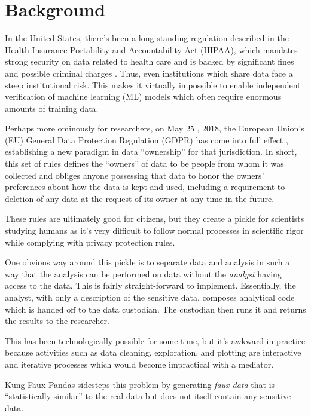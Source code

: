 \documentclass{article}
\begin{document}
\section{Background}

In the United States, there's been a long-standing regulation described in the Health Insurance Portability and Accountability Act (HIPAA), which mandates strong security on data related to health care and is backed by significant fines and possible criminal charges \cite{hippaviol}.  Thus, even institutions which share data face a steep institutional risk. This makes it virtually impossible to enable independent verification of machine learning (ML) models which often require enormous amounts of training data.

Perhaps more ominously for researchers, on May 25 , 2018, the European Union's (EU) General Data Protection Regulation (GDPR) has come into full effect \cite{gdpr}, establishing a new paradigm in data ``ownership'' for that jurisdiction.   In short, this set of rules defines the ``owners'' of data to be people from whom it was collected and obliges anyone possessing  that data to  honor the owners' preferences about how the data is kept and used, including a requirement to deletion of any data at the request of its owner at any time in the future.

These rules are ultimately good for citizens, but they create a pickle for scientists studying humans as it's very difficult to follow normal processes in scientific rigor while complying with privacy protection rules.

One obvious way around this pickle is to separate data and analysis in such a way that the analysis can be performed on data without the \emph{analyst} having access to the data.   This is fairly straight-forward to implement.   Essentially, the analyst, with only a description of the sensitive data, composes analytical code which is handed off to the data custodian.  The custodian then runs it and returns the results to the researcher.

This has been technologically possible for some time, but it's awkward in practice because activities such as data cleaning, exploration, and plotting are interactive and iterative processes which would become impractical with a mediator.

Kung Faux Pandas sidesteps this problem by generating \emph{faux-data} that is ``statistically similar'' to the real data but does not itself contain any sensitive data.
\end{document}
